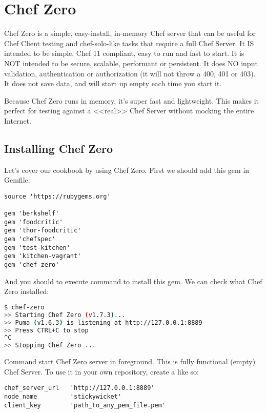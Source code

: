 \section{Chef Zero}
\label{sec:testing-chef-zero}

Chef Zero is a simple, easy-install, in-memory Chef server that can be useful for Chef Client testing and chef-solo-like tasks that require a full Chef Server. It IS intended to be simple, Chef 11 compliant, easy to run and fast to start. It is NOT intended to be secure, scalable, performant or persistent. It does NO input validation, authentication or authorization (it will not throw a 400, 401 or 403). It does not save data, and will start up empty each time you start it.

Because Chef Zero runs in memory, it's super fast and lightweight. This makes it perfect for testing against a <<real>> Chef Server without mocking the entire Internet.

\subsection{Installing Chef Zero}

Let's cover our cookbook by using Chef Zero. First we should add this gem in Gemfile:

\begin{lstlisting}[label=lst:testing-chef-zero1]
source 'https://rubygems.org'

gem 'berkshelf'
gem 'foodcritic'
gem 'thor-foodcritic'
gem 'chefspec'
gem 'test-kitchen'
gem 'kitchen-vagrant'
gem 'chef-zero'
\end{lstlisting}

And you should to execute  command to install this gem. We can check what Chef Zero installed:

\begin{lstlisting}[language=Bash,label=lst:testing-chef-zero2]
$ chef-zero
>> Starting Chef Zero (v1.7.3)...
>> Puma (v1.6.3) is listening at http://127.0.0.1:8889
>> Press CTRL+C to stop
^C
>> Stopping Chef Zero ...
\end{lstlisting}

Command  start Chef Zero server in foreground. This is fully functional (empty) Chef Server. To use it in your own repository, create a  like so:

\begin{lstlisting}[label=lst:testing-chef-zero3]
chef_server_url   'http://127.0.0.1:8889'
node_name         'stickywicket'
client_key        'path_to_any_pem_file.pem'
\end{lstlisting}


